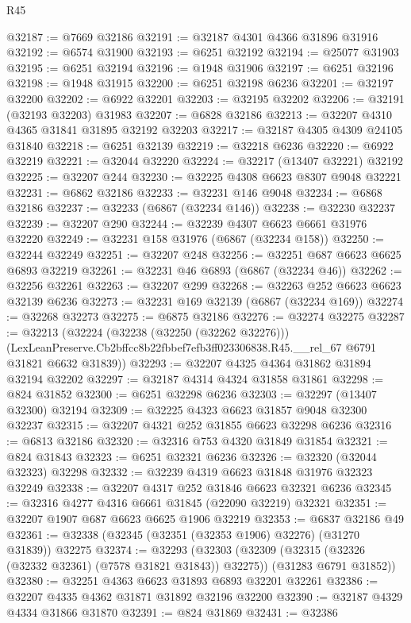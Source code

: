 \begin{lexlean}{R45}
\begin{coremodule}
{@32187 := @7669 @32186
@32191 := @32187 @4301 @4366 @31896 @31916
@32192 := @6574 @31900
@32193 := @6251 @32192
@32194 := @25077 @31903
@32195 := @6251 @32194
@32196 := @1948 @31906
@32197 := @6251 @32196
@32198 := @1948 @31915
@32200 := @6251 @32198 @6236
@32201 := @32197 @32200
@32202 := @6922 @32201
@32203 := @32195 @32202
@32206 := @32191 (@32193 @32203) @31983
@32207 := @6828 @32186
@32213 := @32207 @4310 @4365 @31841 @31895 @32192 @32203
@32217 := @32187 @4305 @4309 @24105 @31840
@32218 := @6251 @32139
@32219 := @32218 @6236
@32220 := @6922 @32219
@32221 := @32044 @32220
@32224 := @32217 (@13407 @32221) @32192
@32225 := @32207 @244
@32230 := @32225 @4308 @6623 @8307 @9048 @32221
@32231 := @6862 @32186
@32233 := @32231 @146 @9048
@32234 := @6868 @32186
@32237 := @32233 (@6867 (@32234 @146))
@32238 := @32230 @32237
@32239 := @32207 @290
@32244 := @32239 @4307 @6623 @6661 @31976 @32220
@32249 := @32231 @158 @31976 (@6867 (@32234 @158))
@32250 := @32244 @32249
@32251 := @32207 @248
@32256 := @32251 @687 @6623 @6625 @6893 @32219
@32261 := @32231 @46 @6893 (@6867 (@32234 @46))
@32262 := @32256 @32261
@32263 := @32207 @299
@32268 := @32263 @252 @6623 @6623 @32139 @6236
@32273 := @32231 @169 @32139 (@6867 (@32234 @169))
@32274 := @32268 @32273
@32275 := @6875 @32186
@32276 := @32274 @32275
@32287 := @32213
    (@32224
      (@32238 (@32250 (@32262 @32276)))
      (LexLeanPreserve.Cb2bffcc8b22fbbef7efb3ff023306838.R45.__rel_67 @6791 @31821 @6632 @31839))
@32293 := @32207 @4325 @4364 @31862 @31894 @32194 @32202
@32297 := @32187 @4314 @4324 @31858 @31861
@32298 := @824 @31852
@32300 := @6251 @32298 @6236
@32303 := @32297 (@13407 @32300) @32194
@32309 := @32225 @4323 @6623 @31857 @9048 @32300 @32237
@32315 := @32207 @4321 @252 @31855 @6623 @32298 @6236
@32316 := @6813 @32186
@32320 := @32316 @753 @4320 @31849 @31854
@32321 := @824 @31843
@32323 := @6251 @32321 @6236
@32326 := @32320 (@32044 @32323) @32298
@32332 := @32239 @4319 @6623 @31848 @31976 @32323 @32249
@32338 := @32207 @4317 @252 @31846 @6623 @32321 @6236
@32345 := @32316 @4277 @4316 @6661 @31845 (@22090 @32219) @32321
@32351 := @32207 @1907 @687 @6623 @6625 @1906 @32219
@32353 := @6837 @32186 @49
@32361 := @32338 (@32345 (@32351 (@32353 @1906) @32276) (@31270 @31839)) @32275
@32374 := @32293
    (@32303
      (@32309 (@32315 (@32326 (@32332 @32361) (@7578 @31821 @31843)) @32275))
      (@31283 @6791 @31852))
@32380 := @32251 @4363 @6623 @31893 @6893 @32201 @32261
@32386 := @32207 @4335 @4362 @31871 @31892 @32196 @32200
@32390 := @32187 @4329 @4334 @31866 @31870
@32391 := @824 @31869
@32431 := @32386
}
\end{coremodule}
\end{lexlean}
